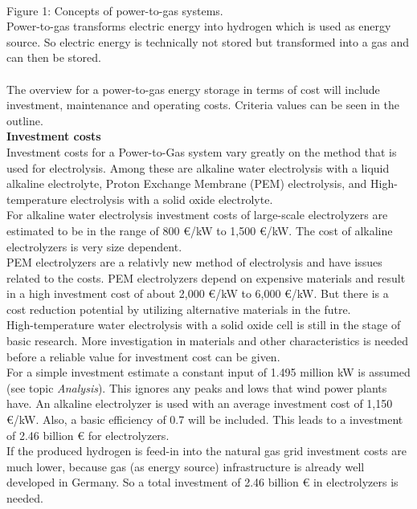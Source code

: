 \begin{parcolumns}[colwidths={1=2.5 cm, 2=10 cm, 3=2.5 cm}]{3}
{\\
Figure 1: Concepts of power-to-gas systems. \\
Power-to-gas transforms electric energy into hydrogen which is used as energy source. So electric energy is technically not stored but transformed into a gas and can then be stored.
\\ \\
The overview for a power-to-gas energy storage in terms of cost will include investment, maintenance and operating costs. Criteria values can be seen in the outline.
\\
\textbf{Investment costs}
\\
Investment costs for a Power-to-Gas system vary greatly on the method that is used for electrolysis. Among these are alkaline water electrolysis with a liquid alkaline electrolyte, Proton Exchange Membrane (PEM) electrolysis, and High-temperature electrolysis with a solid oxide electrolyte.
\\
For alkaline water electrolysis investment costs of large-scale electrolyzers are estimated to be in the range of 800 \euro /kW to 1,500 \euro /kW. The cost of alkaline electrolyzers is very size dependent.
\\
PEM electrolyzers are a relativly new method of electrolysis and have issues related to the costs. PEM electrolyzers depend on expensive materials and result in a high investment cost of about 2,000 \euro /kW to 6,000 \euro /kW. But there is a cost reduction potential by utilizing alternative materials in the futre.
\\
High-temperature water electrolysis with a solid oxide cell is still in the stage of basic research. More investigation in materials and other characteristics is needed before a reliable value for investment cost can be given.
\\
For a simple investment estimate a constant input of 1.495 million kW is assumed (see topic \textit{Analysis}). This ignores any peaks and lows that wind power plants have. An alkaline electrolyzer is used with an average investment cost of 1,150 \euro /kW. Also, a basic efficiency of 0.7 will be included. This leads to a investment of 2.46 billion \euro{ }for electrolyzers. \\
If the produced hydrogen is feed-in into the natural gas grid investment costs are much lower, because gas (as energy source) infrastructure is already well developed in Germany. So a total investment of 2.46 billion \euro{ } in electrolyzers is needed.  \\
}
\end{parcolumns}
